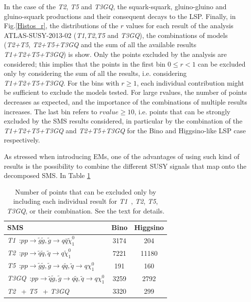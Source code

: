 \documentclass[preprint,number,sort&compress,twocolumn,3p]{elsstyarticle}
\newcommand{\TGQ}{ \textit{T3GQ}}
\newcommand{\Tone}{ \textit{T1}}
\newcommand{\Ttwo}{ \textit{T2}}
\newcommand{\Tfive}{ \textit{T5}}
\begin{document}
In the case of the \textit{T2}, \textit{T5} and \textit{T3GQ}, the squark-squark, gluino-gluino and gluino-squark productions and their consequent decays to the LSP. Finally, in Fig.\ref{Histos_r}, the distributions of the $r$ values for each result of the analysis ATLAS-SUSY-2013-02 (\textit{T1},\textit{T2},\textit{T5} and \textit{T3GQ}), the combinations of models (\textit{T2+T5}, \textit{T2+T5+T3GQ} and the sum of all the available results \textit{T1+T2+T5+T3GQ}) is show. Only the points excluded by the analysis are considered; this implies that the points in the first bin $0\leq r < 1$ can be excluded only by considering the sum of all the results, i.e. considering \textit{T1+T2+T5+T3GQ}. For the bins with $r \geq 1$, each individual contribution might be sufficient to exclude the models tested. For large rvalues, the number of points decreases as expected, and the importance of the combinations of multiple results increases. The last bin refers to $rvalue \geq 10$, i.e. points that can be strongly excluded by the SMS results considered, in particular by the combination of the \textit{T1+T2+T5+T3GQ} and \textit{T2+T5+T3GQ} for the Bino and Higgsino-like LSP case respectively. 
%
%

As stressed when introducing EMs, one of the advantages of using such kind of results is the possibility to combine the different SUSY signals that map onto the decomposed SMS. In Table \ref{breakdown_number} 
\begin{table}[!h]
	\footnotesize
	\begin{center}
		\renewcommand{\arraystretch}{1.3}
		\begin{tabular}{ l c c }  \toprule \toprule
			\textbf{SMS} & \textbf{Bino} & \textbf{Higgsino} \\  \toprule
			\Tone~:$p p \rightarrow \tilde g \tilde g , \tilde g \rightarrow q \bar q \tilde \chi_1 ^0$ & 3174 & 204   \\
			\Ttwo~:$p p \rightarrow \tilde q \tilde q , \tilde q \rightarrow q \tilde \chi_1 ^0$ & 7221 & 11180 \\
			\Tfive~:$p p \rightarrow \tilde g \tilde g , \tilde g \rightarrow q \tilde q , \tilde q  \rightarrow q \chi_1 ^0$ & 191 & 160  \\
			\TGQ~:$p p \rightarrow \tilde q \tilde g , \tilde g \rightarrow q \tilde q , \tilde q  \rightarrow q \chi_1 ^0$ & 3259 & 2792  \\
			\Ttwo~ +\Tfive~ +\TGQ~ & 3320 & 299 \\
			\bottomrule \bottomrule 
		\end{tabular}
	\end{center}
	\caption{Number of points that can be excluded only by including each individual result for \Tone~,\Ttwo,\Tfive,\TGQ, or their combination. See the text for details.}
	\label{breakdown_number} 
\end{table}
\end{document}
